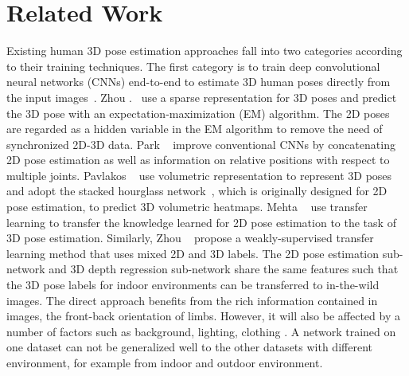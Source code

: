 \documentclass[10pt,twocolumn,letterpaper]{article}
\begin{document}
\section{Related Work}
Existing human 3D pose estimation approaches fall into two categories according to their training techniques. The first category is to train deep convolutional neural networks (CNNs) end-to-end to estimate 3D human poses directly from the input images~\cite{pavlakos2017coarse,mehta2017monocular,zhou2016deep,park20163D, zhou2017towards, lee2018propagating, sun2018integral}. Zhou \etal.~\cite{zhou2016deep} use a sparse representation for 3D poses and predict the 3D pose with an expectation-maximization (EM) algorithm. The 2D poses are regarded as a hidden variable in the EM algorithm to remove the need of synchronized 2D-3D data. Park \etal~\cite{park20163D} improve conventional CNNs by concatenating 2D pose estimation as well as information on relative positions with respect to multiple joints. Pavlakos \etal~\cite{pavlakos2017coarse} use volumetric representation to represent 3D poses and adopt the stacked hourglass network~\cite{newell2016stacked}, which is originally designed for 2D pose estimation, to predict 3D volumetric heatmaps. Mehta \etal~\cite{mehta2017monocular} use transfer learning to transfer the knowledge learned for 2D pose estimation to the task of 3D pose estimation. Similarly, Zhou \etal~\cite{zhou2017towards} propose a weakly-supervised transfer learning method that uses mixed 2D and 3D labels. The 2D pose estimation sub-network and 3D depth regression sub-network share the same features such that the 3D pose labels for indoor environments can be transferred to in-the-wild images. The direct approach benefits from the rich information contained in images, \eg the front-back orientation of limbs. However, it will also be affected by a number of factors such as background, lighting, clothing \etc. A network trained on one dataset can not be generalized well to the other datasets with different environment, for example from indoor and outdoor environment. 
\end{document}

